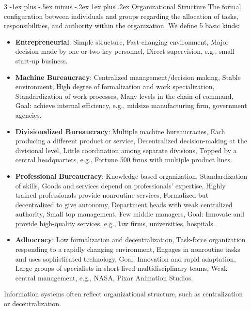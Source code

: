 \documentclass[10pt, landscape]{article}
\makeatletter
\renewcommand{\subsubsection}{\@startsection{subsubsection}{3}{0mm}%
                                {-1ex plus -.5ex minus -.2ex}%
                                {1ex plus .2ex}%
                                {\normalfont\small\bfseries}}
\makeatother
\begin{document}
\begin{multicols*}{3}
\subsubsection{Organizational Structure}
The formal configuration between individuals and groups regarding the allocation of tasks, responsibilities, and authority within the organization. We define 5 basic kinds:
\begin{itemize}
\item \textbf{Entrepreneurial}: Simple structure, Fast-changing environment, Major decision made by one or two key personnel, Direct supervision, e.g., small start-up business.  
\item \textbf{Machine Bureaucracy}: Centralized management/decision making, Stable environment, High degree of formalization and work specialization, Standardization of work processes, Many levels in the chain of command, Goal: achieve internal efficiency, e.g., midsize manufacturing firm, government agencies.  
\item \textbf{Divisionalized Bureaucracy}: Multiple machine bureaucracies, Each producing a different product or service, Decentralized decision-making at the divisional level, Little coordination among separate divisions, Topped by a central headquarters, e.g., Fortune 500 firms with multiple product lines.  
\item \textbf{Professional Bureaucracy}: Knowledge-based organization, Standardization of skills, Goods and services depend on professionals' expertise, Highly trained professionals provide nonroutine services, Formalized but decentralized to give autonomy, Department heads with weak centralized authority, Small top management, Few middle managers, Goal: Innovate and provide high-quality services, e.g., law firms, universities, hospitals.  
\item \textbf{Adhocracy}: Low formalization and decentralization, Task-force organization responding to a rapidly changing environment, Engages in nonroutine tasks and uses sophisticated technology, Goal: Innovation and rapid adaptation, Large groups of specialists in short-lived multidisciplinary teams, Weak central management, e.g., NASA, Pixar Animation Studios.  
\end{itemize}
Information systems often reflect organizational structure, such as centralization or decentralization. 


\end{multicols*}
\end{document}
